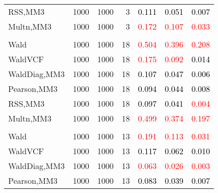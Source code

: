 \documentclass[
]{article}
\begin{document}
\begin{table}[H]
{\begin{tabular}[t]{lrrrrrr}
\hspace{1em}RSS,MM3 & 1000 & 1000 & 3 & \textcolor{black}{0.111} & \textcolor{black}{0.051} & \textcolor{black}{0.007}\\
\hspace{1em}Multn,MM3 & 1000 & 1000 & 3 & \textcolor{red}{0.172} & \textcolor{red}{0.107} & \textcolor{red}{0.033}\\
\addlinespace[0.3em]
\multicolumn{7}{l}{\textbf{1F 15V}}\\
\hspace{1em}Wald & 1000 & 1000 & 18 & \textcolor{red}{0.504} & \textcolor{red}{0.396} & \textcolor{red}{0.208}\\
\hspace{1em}WaldVCF & 1000 & 1000 & 18 & \textcolor{red}{0.175} & \textcolor{red}{0.092} & \textcolor{black}{0.014}\\
\hspace{1em}WaldDiag,MM3 & 1000 & 1000 & 18 & \textcolor{black}{0.107} & \textcolor{black}{0.047} & \textcolor{black}{0.006}\\
\hspace{1em}Pearson,MM3 & 1000 & 1000 & 18 & \textcolor{black}{0.094} & \textcolor{black}{0.044} & \textcolor{black}{0.008}\\
\hspace{1em}RSS,MM3 & 1000 & 1000 & 18 & \textcolor{black}{0.097} & \textcolor{black}{0.041} & \textcolor{red}{0.004}\\
\hspace{1em}Multn,MM3 & 1000 & 1000 & 18 & \textcolor{red}{0.499} & \textcolor{red}{0.374} & \textcolor{red}{0.197}\\
\addlinespace[0.3em]
\multicolumn{7}{l}{\textbf{2F 10V}}\\
\hspace{1em}Wald & 1000 & 1000 & 13 & \textcolor{red}{0.191} & \textcolor{red}{0.113} & \textcolor{red}{0.031}\\
\hspace{1em}WaldVCF & 1000 & 1000 & 13 & \textcolor{black}{0.117} & \textcolor{black}{0.062} & \textcolor{black}{0.010}\\
\hspace{1em}WaldDiag,MM3 & 1000 & 1000 & 13 & \textcolor{red}{0.063} & \textcolor{red}{0.026} & \textcolor{red}{0.003}\\
\hspace{1em}Pearson,MM3 & 1000 & 1000 & 13 & \textcolor{black}{0.083} & \textcolor{black}{0.039} & \textcolor{black}{0.007}\\

\end{tabular}}
\end{table}
\end{document}
